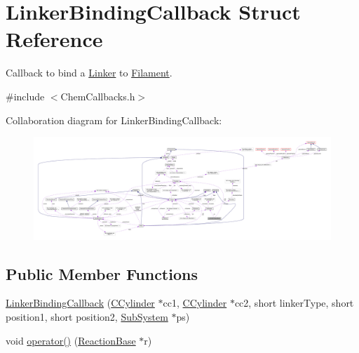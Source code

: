 \hypertarget{structLinkerBindingCallback}{\section{Linker\+Binding\+Callback Struct Reference}
\label{structLinkerBindingCallback}
}


Callback to bind a \hyperlink{classLinker}{Linker} to \hyperlink{classFilament}{Filament}.  




{\ttfamily \#include $<$Chem\+Callbacks.\+h$>$}



Collaboration diagram for Linker\+Binding\+Callback\+:
\nopagebreak
\begin{figure}[H]
\begin{center}
\leavevmode
\includegraphics[width=350pt]{structLinkerBindingCallback__coll__graph}
\end{center}
\end{figure}
\subsection*{Public Member Functions}
\begin{DoxyCompactItemize}
\item 
\hyperlink{structLinkerBindingCallback_a5e4fbddc0c535daef933ce2e42a7f8f4}{Linker\+Binding\+Callback} (\hyperlink{classCCylinder}{C\+Cylinder} $\ast$cc1, \hyperlink{classCCylinder}{C\+Cylinder} $\ast$cc2, short linker\+Type, short position1, short position2, \hyperlink{classSubSystem}{Sub\+System} $\ast$ps)
\item 
void \hyperlink{structLinkerBindingCallback_a401ea7895bbb4e21a6c6139fd14ba6b7}{operator()} (\hyperlink{classReactionBase}{Reaction\+Base} $\ast$r)
\end{DoxyCompactItemize}
